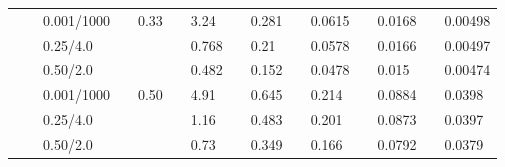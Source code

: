 \begin{table}
\begin{tabular}{*{15}{l}}
    && 0.001/1000 &&
    \multirow{3}{*}{0.33} &&
	3.24 && 0.281 && 0.0615 && 0.0168 && 0.00498
    \\
    && 0.25/4.0 &&
    &&
	0.768 && 0.21 && 0.0578 && 0.0166 && 0.00497
    \\
    && 0.50/2.0 &&
    &&
	0.482 && 0.152 && 0.0478 && 0.015 && 0.00474
    \\
    \cline{2-15}
    
    && 0.001/1000 &&
    \multirow{3}{*}{0.50} &&
	4.91 && 0.645 && 0.214 && 0.0884 && 0.0398
    \\
    && 0.25/4.0 &&
    &&
	1.16 && 0.483 && 0.201 && 0.0873 && 0.0397
    \\
    && 0.50/2.0 &&
    &&
	0.73 && 0.349 && 0.166 && 0.0792 && 0.0379
    \\
    \cline{2-15}

    \hline\bottomrule
  \end{tabular}
\end{table}

